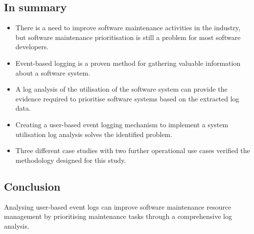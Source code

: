 \subsection{In summary}
\begin{itemize}
	\item There is a need to improve software maintenance activities in the industry, but software maintenance prioritisation is still a problem for most software developers.
	\item Event-based logging is a proven method for gathering valuable information about a software system.
	\item A log analysis of the utilisation of the software system can provide the evidence required to prioritise software systems based on the extracted log data.
	\item Creating a user-based event logging mechanism to implement a system utilisation log analysis solves the identified problem.
	\item Three different case studies with two further operational use cases verified the methodology designed for this study.
\end{itemize}

\subsection{Conclusion}
Analysing user-based event logs can improve software maintenance resource management by prioritising maintenance tasks through a comprehensive log analysis.